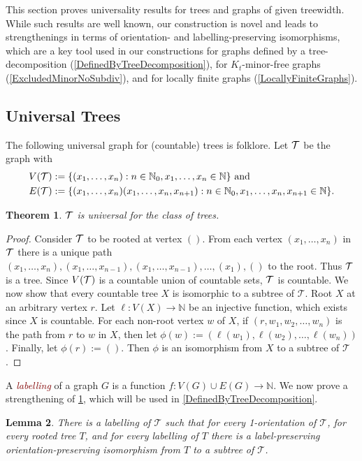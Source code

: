 \documentclass[a4paper,11pt]{article}
\newcommand{\defn}[1]{\textcolor{Maroon}{\emph{#1}}\index{#1}}
\theoremstyle{plain}
\newtheorem{thm}{Theorem}[section]
\newtheorem{lem}[thm]{Lemma}
\theoremstyle{definition}
\newcommand{\T}{\ensuremath{\protect{\mathcal{T}}}}
\newcommand{\TT}{\mathcal{T}}
\newcommand{\NN}{\mathbb{N}}
\begin{document}
This section proves universality results for trees and graphs of given treewidth. While such results are well known, our construction is novel and leads to strengthenings in terms of orientation- and labelling-preserving isomorphisms, which are a key tool used in our constructions for graphs defined by a tree-decomposition (\cref{DefinedByTreeDecomposition}), for $K_t$-minor-free graphs (\cref{ExcludedMinorNoSubdiv}), and for locally finite graphs (\cref{LocallyFiniteGraphs}).

\subsection{Universal Trees}
\label{UniversalTrees}

The following universal graph for (countable) trees is folklore. Let $\T$ be the graph with 
\begin{align*}
V(\T) &:=\{ (x_1,\dots,x_n) : n\in\mathbb{N}_0, x_1,\dots,x_n \in\mathbb{N} \} \text{ and}\\
E(\T) &:= \{ (x_1,\dots,x_n)(x_1,\dots,x_n,x_{n+1}) : n\in\mathbb{N}_0, x_1,\dots,x_n,x_{n+1}\in\mathbb{N} \}.
\end{align*}

\begin{thm}
\label{UniversalTree}
$\T$ is universal for the class of trees.
\end{thm}

\begin{proof}
Consider $\T$ to be rooted at vertex $()$. 
From each vertex $(x_1,\dots,x_n)$ in $\T$ there is a unique path 
$(x_1,\dots,x_n),(x_1,\dots,x_{n-1}),(x_1,\dots,x_{n-1}),\dots,(x_1),()$ to the root. 
Thus $\T$ is a tree. 
Since $V(\T)$ is a countable union of countable sets, $\T$ is countable. 
We now show that every countable tree $X$ is isomorphic to a subtree of $\TT$. Root $X$ at an arbitrary vertex $r$. Let $\ell:V(X)\to\mathbb{N}$ be an injective function, which exists since $X$ is countable. For each non-root vertex $w$ of $X$, if $(r,w_1,w_2,\dots,w_n)$ is the path from $r$ to $w$ in $X$, then  let $\phi(w):=(\ell(w_1),\ell(w_2),\dots,\ell(w_n))$. Finally, let $\phi(r):=()$. Then $\phi$ is an isomorphism from $X$ to a subtree of $\TT$.  
\end{proof}

A \defn{labelling} of a graph $G$ is a function $f:V(G)\cup E(G)\to\NN$.
We now prove a strengthening of \cref{UniversalTree}, which will be used in \cref{DefinedByTreeDecomposition}. 

\begin{lem}
\label{UniversalTreePreserving}
There is a labelling of $\TT$ such that for every 1-orientation of $\TT$, for every rooted tree $T$, and for every labelling of $T$ there is a label-preserving orientation-preserving isomorphism from $T$ to a subtree of $\TT$. 
\end{lem}
\end{document}
